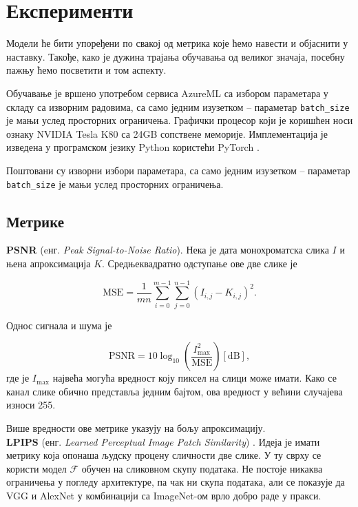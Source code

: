 \documentclass[12pt, a4paper, twoside]{book}
\numberwithin{equation}{chapter}
\numberwithin{theorem}{section}
\numberwithin{definition}{section}
\numberwithin{definitionChapter}{chapter}
\begin{document}
\chapter{Експерименти}
Модели ће бити упоређени по свакој од метрика које ћемо навести и објаснити у наставку. Такође, како је дужина
трајања обучавања од великог значаја, посебну пажњу ћемо посветити и том аспекту.

Обучавање је вршено употребом сервиса AzureML са избором параметара у складу са изворним радовима, са само једним
изузетком -- параметар \texttt{batch\_size} је мањи услед просторних ограничења. Графички процесор који је коришћен
носи ознаку NVIDIA Tesla K80 са 24GB сопствене меморије. Имплементација је изведена у програмском језику Python
користећи PyTorch \cite{pytorch}.

Поштовани су изворни избори параметара, са само једним изузетком -- параметар \texttt{batch\_size} је мањи
услед просторних ограничења.

\section{Метрике}
\noindent \textbf{PSNR} (eнг. \textit{Peak Signal-to-Noise Ratio}). Нека је дата монохроматска слика $I$ и њена
апроксимација $K$. Средњеквадратно одступање ове две слике је

\begin{equation}
	\text{MSE} = \frac{1}{mn} \sum_{i=0}^{m-1}\sum_{j=0}^{n-1}(I_{i, j} - K_{i, j})^2.
\end{equation}

Однос сигнала и шума је

\begin{equation}
	\text{PSNR} = 10\log_{10}\left(\frac{I_{\max}^2}{\text{MSE}}\right) \left[\text{dB}\right],
\end{equation}
где је $I_{\max}$ највећа могућа вредност коју пиксел на слици може имати. Како се канал слике обично
представља једним бајтом, ова вредност у већини случајева износи 255.

Више вредности ове метрике указују на бољу апроксимацију. \\

\noindent \textbf{LPIPS} (енг. \textit{Learned Perceptual Image Patch Similarity}) \cite{lpips}. Идеја је имати метрику
која опонаша људску процену сличности две слике. У ту сврху се користи модел $\mathcal{F}$ обучен на сликовном
скупу података. Не постоје никаква ограничења у погледу архитектуре, па чак ни скупа података, али се показује да
VGG \cite{vgg} и AlexNet \cite{alexnet} у комбинацији са ImageNet-ом врло добро раде у пракси.
\end{document}
